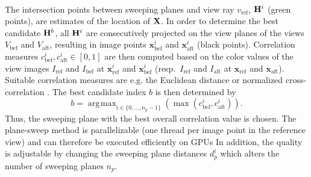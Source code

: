 \documentclass[conference]{IEEEtran}
\newcommand{\ico}[1]{\mathbf{#1}}
\newcommand{\sco}[1]{\uppercase{\mathbf{#1}}}
\DeclareMathOperator*{\argmax}{\arg\!\max}
\begin{document}
\\
The intersection points between sweeping planes and view ray $v_{\text{ref}}$, $\sco{h}^i$ (green points), are estimates of the location of $\sco{X}$.
In order to determine the best candidate $\sco{H}^b$, all $\sco{h}^i$ are consecutively projected on the view planes of the views $V_{\text{bef}}$ and $V_{\text{aft}}$, resulting in image points $\ico{x}_{\text{bef}}^i$ and $\ico{x}_{\text{aft}}^i$ (black points).
Correlation measures $c_{\text{bef}}^i, c_{\text{aft}}^i \in [0,1]$ are then computed based on the color values of the view images $I_{\text{ref}}$ and $I_{\text{bef}}$ at $\ico{x}_{\text{ref}}^i$ and $\ico{x}_{\text{bef}}^i$ (resp.\ $I_{\text{ref}}$ and $I_{\text{aft}}$ at $\ico{x}_{\text{ref}}$ and $\ico{x}_{\text{aft}}$).
Suitable correlation measures are e.g. the Euclidean distance or normalized cross-correlation \cite{Lewis1995}.
The best candidate index $b$ is then determined by 
$$b = \argmax_{i\in\{0,\ldots,n_p-1\}}{(\max(c_{\text{bef}}^i,c_{\text{aft}}^i))}.$$
Thus, the sweeping plane with the best overall correlation value is chosen. 
The plane-sweep method is parallelizable (one thread per image point in the reference view) and can therefore be executed efficiently on GPUs
In addition, the quality is adjustable by changing the sweeping plane distances $d_p^i$ which alters the number of sweeping planes $n_p$.
\end{document}
